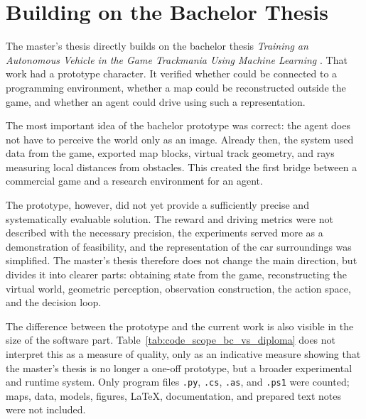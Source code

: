 \section{Building on the Bachelor Thesis}

The master's thesis directly builds on the bachelor thesis \emph{Training an Autonomous Vehicle in the Game Trackmania Using Machine Learning} \cite{melkovic2024bachelor}. That work had a prototype character. It verified whether \Trackmania{} could be connected to a programming environment, whether a map could be reconstructed outside the game, and whether an agent could drive using such a representation.

The most important idea of the bachelor prototype was correct: the agent does not have to perceive the world only as an image. Already then, the system used data from the game, exported map blocks, virtual track geometry, and rays measuring local distances from obstacles. This created the first bridge between a commercial game and a research environment for an agent.

The prototype, however, did not yet provide a sufficiently precise and systematically evaluable solution. The reward and driving metrics were not described with the necessary precision, the experiments served more as a demonstration of feasibility, and the representation of the car surroundings was simplified. The master's thesis therefore does not change the main direction, but divides it into clearer parts: obtaining state from the game, reconstructing the virtual world, geometric perception, observation construction, the action space, and the decision loop.

The difference between the prototype and the current work is also visible in the size of the software part. Table~\ref{tab:code_scope_bc_vs_diploma} does not interpret this as a measure of quality, only as an indicative measure showing that the master's thesis is no longer a one-off prototype, but a broader experimental and runtime system. Only program files \texttt{.py}, \texttt{.cs}, \texttt{.as}, and \texttt{.ps1} were counted; maps, data, models, figures, LaTeX, documentation, and prepared text notes were not included.

